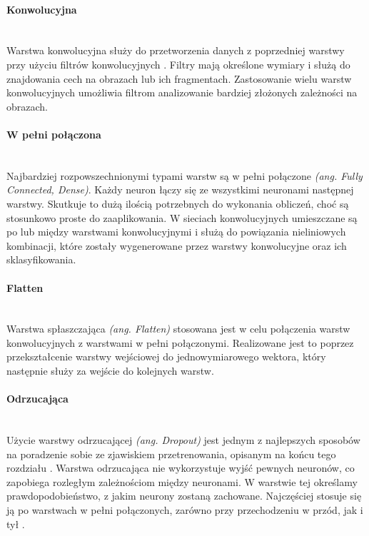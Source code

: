\paragraph{Konwolucyjna} \mbox{}\\
Warstwa konwolucyjna służy do przetworzenia danych z poprzedniej warstwy przy użyciu
filtrów konwolucyjnych \cite{CS231n}. Filtry mają określone wymiary i służą do znajdowania cech
na obrazach lub ich fragmentach. Zastosowanie wielu warstw konwolucyjnych umożliwia filtrom
analizowanie bardziej złożonych zależności na obrazach.

\paragraph{W pełni połączona} \mbox{}\\
Najbardziej rozpowszechnionymi typami warstw są w pełni połączone \textit{(ang. Fully Connected, Dense)}.
Każdy neuron łączy się ze wszystkimi neuronami następnej warstwy. Skutkuje to dużą ilością
potrzebnych do wykonania obliczeń, choć są stosunkowo proste do zaaplikowania.
W sieciach konwolucyjnych umieszczane są po lub między warstwami konwolucyjnymi
i służą do powiązania nieliniowych kombinacji, które zostały wygenerowane przez
warstwy konwolucyjne oraz ich sklasyfikowania.

\paragraph{Flatten} \mbox{}\\
Warstwa spłaszczająca \textit{(ang. Flatten)} stosowana jest w celu połączenia warstw
konwolucyjnych z warstwami w pełni połączonymi. Realizowane jest to poprzez przekształcenie
warstwy wejściowej do jednowymiarowego wektora, który następnie służy za wejście
do kolejnych warstw.

\paragraph{Odrzucająca} \mbox{}\\
Użycie warstwy odrzucającej \textit{(ang. Dropout)} jest jednym z najlepszych sposobów
na poradzenie sobie ze zjawiskiem przetrenowania, opisanym na końcu tego rozdziału
\cite{DropoutPreventOverfit}. Warstwa odrzucająca nie wykorzystuje wyjść pewnych neuronów,
co zapobiega rozległym zależnościom między neuronami. W warstwie tej określamy prawdopodobieństwo,
z jakim neurony zostaną zachowane. Najczęściej stosuje się ją po warstwach w pełni
połączonych, zarówno przy przechodzeniu w przód, jak i tył \cite{DropConnect}.

